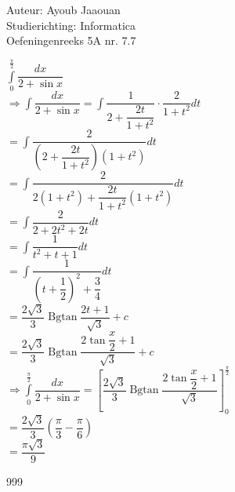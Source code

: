 \documentclass[a4paper]{article}
\begin{document}
\noindent \large Auteur: Ayoub Jaaouan \\
\noindent \large Studierichting: Informatica\\
\noindent \large Oefeningenreeks 5A nr. 7.7\\
\medskip

\normalsize

$\displaystyle\int\limits_0^{\tfrac{\pi}{2}} \dfrac{dx}{2+\sin x}$\\


$\Rightarrow \displaystyle\int \dfrac{dx}{2+\sin x}
=
\displaystyle\int \dfrac{1}{2+\dfrac{2t}{1+t^2}} \cdot \dfrac{2}{1+t^2}dt$\\

$=
\displaystyle\int
\dfrac{2}{\left(2+\dfrac{2t}{1+t^2}\right)(1+t^2)}dt$\\

$=
\displaystyle\int
\dfrac{2}{2(1+t^2)+\dfrac{2t}{1+t^2}(1+t^2)}dt$\\

$=
\displaystyle\int
\dfrac{2}{2+2t^2+2t}dt$\\

$=
\displaystyle\int
\dfrac{1}{t^2+t+1}dt$\\

$=
\displaystyle\int
\dfrac{1}{\left(t+\dfrac12\right)^2+\dfrac34}dt$\\

$=
\dfrac{2\sqrt3}{3}\operatorname{Bgtan}\dfrac{2t+1}{\sqrt3}+c$\\

$=
\dfrac{2\sqrt3}{3}\operatorname{Bgtan}\dfrac{2\tan\dfrac{x}{2}+1}{\sqrt3}+c$\\

$\Rightarrow
\displaystyle\int\limits_0^{\tfrac{\pi}{2}}
\dfrac{dx}{2+\sin x}
=
\left[
\dfrac{2\sqrt3}{3}\operatorname{Bgtan}
\dfrac{2\tan\dfrac{x}{2}+1}{\sqrt3}
\right]_0^{\tfrac{\pi}{2}}$\\

$=
\dfrac{2\sqrt3}{3}
\left(
\dfrac{\pi}{3}-\dfrac{\pi}{6}
\right)$\\

$=
\dfrac{\pi\sqrt3}{9}$
\begin{thebibliography}{999}
\end{thebibliography}
\end{document}
